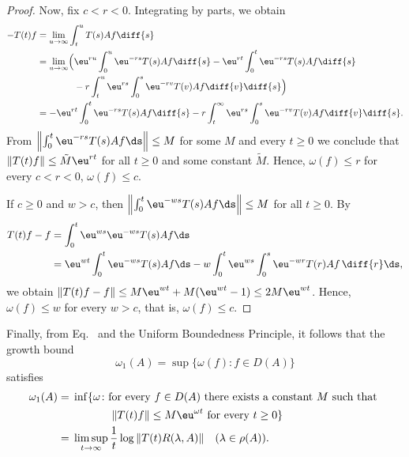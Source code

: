 \begin{proof}
Now, fix $c < r < 0$.
Integrating by parts, we obtain
\begin{align*}
-T(t)f 
  &= \lim_{u \to \infty} \int_{t}^{u} T(s)Af \diff{s}\\
  &= \lim_{u \to \infty} \Bigl( 
       \eu^{ru} \int_0^u \eu^{-rs} T(s) Af \diff{s} 
     - \eu^{rt} \int_0^t \eu^{-rs} T(s) Af \diff{s} \\
  &\hphantom{{}= \lim_{u \to \infty} \Bigl(}
     {}- r \int_t^u \eu^{rs} \int_0^s \eu^{-rv} T(v) Af \diff{v} \diff{s}
     \Bigr) \\
  &= - \eu^{rt} \int_0^t \eu^{-rs} T(s) Af \diff{s} 
     - r \int_t^\infty \eu^{rs} \int_0^s \eu^{-rv} T(v) Af \diff{v} \diff{s}.
\end{align*}
From $\left\|\int_{0}^{t} \eu^{-r s} T(s)Af  \ds\right\| \leq M$ for some $M$ and every $t \geq 0$ we conclude that $\|T(t)f\| \leq \tilde{M}\eu^{rt}$ for all $t \geq 0$ and some constant $\tilde{M}$.
Hence, $\omega(f) \leq r$ for every $c < r < 0$, \ie $\omega(f) \leq c$.

If\/ $c \geq 0$ and $w > c$, then $\left\|\int_{0}^{t} \eu^{-w s} T(s)Af \ds\right\| \leq M$ for all $t \geq 0$. 
By 
\begin{align*}
T(t)f - f &= \int_{0}^{t} \eu^{w s} \eu^{-w s} T(s)Af  \ds\\
&= \eu^{wt}\int_0^t \eu^{-ws} T(s)Af \ds - w\int_0^t\eu^{ws}\int_0^s \eu^{-wr} T(r)Af\, \diff{r} \ds,
\end{align*}
we obtain $\|T(t)f-f\| \leq M\eu^{w t} + M(\eu^{w t} - 1)
\le 2M\eu^{wt}$. 
Hence, $\omega(f)\le w$ for every $w > c$, that is, $\omega(f) \leq c$.
\end{proof}
Finally, from Eq.~ and the Uniform Boundedness Principle, it follows that the growth bound 
%
\[
	\omega_{1}(A) = \sup\{\omega(f) \colon f \in D(A)\}
\]
%
satisfies
\begin{equation}\label{eq:a4-1.3}
\begin{split}
\omega_1(A) &={} \inf \{ \omega \colon \text{for every  $f \in D(A)$  there exists a constant $ M $ such that  } \\
& \phantom{xxxxxxxx} \text{ $\|T(t)f\| \leq M\eu^{\omega t}$  for every $t \geq 0$} \} \\
&={}
\limsup_{t \to \infty} \frac{1}{t} \log\|T(t)R(\lambda,A)\| \quad (\lambda \in \rho(A)). 
\end{split}
\end{equation}

